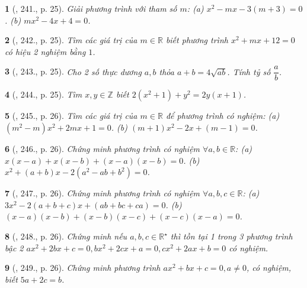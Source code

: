 \documentclass{article}
\newtheorem{baitoan}{}
\begin{document}
\begin{baitoan}[\cite{Binh_Toan_9_tap_2}, 241., p. 25]
	Giải phương trình với tham số $m$: (a) $x^2 - mx - 3(m + 3) = 0$. (b) $mx^2 - 4x + 4 = 0$.
\end{baitoan}

\begin{baitoan}[\cite{Binh_Toan_9_tap_2}, 242., p. 25]
	Tìm các giá trị của $m\in\mathbb{R}$ biết phương trình $x^2 + mx + 12 = 0$ có hiệu 2 nghiệm bằng $1$.
\end{baitoan}

\begin{baitoan}[\cite{Binh_Toan_9_tap_2}, 243., p. 25]
	Cho 2 số thực dương $a,b$ thỏa $a + b = 4\sqrt{ab}$. Tính tỷ số $\dfrac{a}{b}$.
\end{baitoan}

\begin{baitoan}[\cite{Binh_Toan_9_tap_2}, 244., p. 25]
	Tìm $x,y\in\mathbb{Z}$ biết $2(x^2 + 1) + y^2 = 2y(x + 1)$.
\end{baitoan}

\begin{baitoan}[\cite{Binh_Toan_9_tap_2}, 245., p. 26]
	Tìm các giá trị của $m\in\mathbb{R}$ để phương trình có nghiệm: (a) $(m^2 - m)x^2 + 2mx + 1 = 0$. (b) $(m + 1)x^2 - 2x + (m - 1) = 0$.
\end{baitoan}

\begin{baitoan}[\cite{Binh_Toan_9_tap_2}, 246., p. 26]
	Chứng minh phương trình có nghiệm $\forall a,b\in\mathbb{R}$: (a) $x(x - a) + x(x - b) + (x - a)(x - b) = 0$. (b) $x^2 + (a + b)x - 2(a^2 - ab + b^2) = 0$.
\end{baitoan}

\begin{baitoan}[\cite{Binh_Toan_9_tap_2}, 247., p. 26]
	Chứng minh phương trình có nghiệm $\forall a,b,c\in\mathbb{R}$: (a) $3x^2 - 2(a + b + c)x + (ab + bc + ca) = 0$. (b) $(x - a)(x - b) + (x - b)(x - c) + (x - c)(x - a) = 0$.
\end{baitoan}

\begin{baitoan}[\cite{Binh_Toan_9_tap_2}, 248., p. 26]
	Chứng minh nếu $a,b,c\in\mathbb{R}^\star$ thì tồn tại 1 trong 3 phương trình bậc 2 $ax^2 + 2bx + c = 0,bx^2 + 2cx + a = 0,cx^2 + 2ax + b = 0$ có nghiệm.
\end{baitoan}

\begin{baitoan}[\cite{Binh_Toan_9_tap_2}, 249., p. 26]
	Chứng minh phương trình $ax^2 + bx + c = 0,a\ne0$, có nghiệm, biết $5a + 2c = b$.
\end{baitoan}
\end{document}
